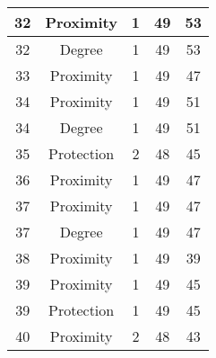 \documentclass[results.tex]{subfiles}
\begin{document}
\begin{center}
\begin{tabular}{| c || c | c | c | c |}
            \hline
            32                      & Proximity                    & 1                      & 49                      & 53                   \\
            \hline
            32                      & Degree                       & 1                      & 49                      & 53                   \\
            \hline
            33                      & Proximity                    & 1                      & 49                      & 47                   \\
            \hline
            34                      & Proximity                    & 1                      & 49                      & 51                   \\
            \hline
            34                      & Degree                       & 1                      & 49                      & 51                   \\
            \hline
            35                      & Protection                   & 2                      & 48                      & 45                   \\
            \hline
            36                      & Proximity                    & 1                      & 49                      & 47                   \\
            \hline
            37                      & Proximity                    & 1                      & 49                      & 47                   \\
            \hline
            37                      & Degree                       & 1                      & 49                      & 47                   \\
            \hline
            38                      & Proximity                    & 1                      & 49                      & 39                   \\
            \hline
            39                      & Proximity                    & 1                      & 49                      & 45                   \\
            \hline
            39                      & Protection                   & 1                      & 49                      & 45                   \\
            \hline
            40                      & Proximity                    & 2                      & 48                      & 43                   \\

\end{tabular}
\end{center}
\end{document}
